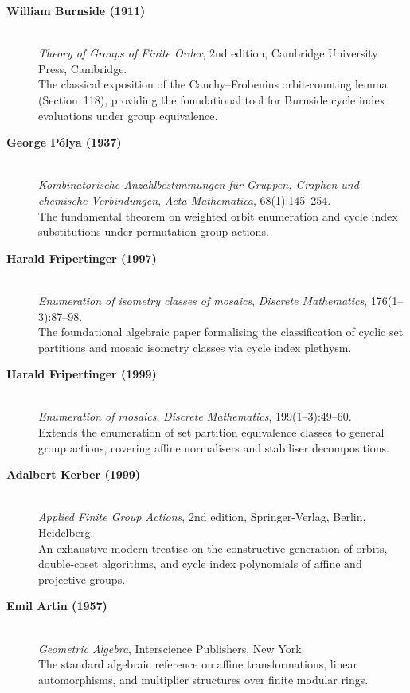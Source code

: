 \begin{description}
    \item[\textbf{William Burnside (1911)}]\mbox{}\\
    \emph{Theory of Groups of Finite Order}, 2nd edition, Cambridge University Press, Cambridge.\\
    The classical exposition of the Cauchy--Frobenius orbit-counting lemma (Section~118), providing the foundational tool for Burnside cycle index evaluations under group equivalence.

    \item[\textbf{George P\'olya (1937)}]\mbox{}\\
    \emph{Kombinatorische Anzahlbestimmungen f\"ur Gruppen, Graphen und chemische Verbindungen}, \emph{Acta Mathematica}, 68(1):145--254.\\
    The fundamental theorem on weighted orbit enumeration and cycle index substitutions under permutation group actions.

    \item[\textbf{Harald Fripertinger (1997)}]\mbox{}\\
    \emph{Enumeration of isometry classes of mosaics}, \emph{Discrete Mathematics}, 176(1--3):87--98.\\
    The foundational algebraic paper formalising the classification of cyclic set partitions and mosaic isometry classes via cycle index plethysm.

    \item[\textbf{Harald Fripertinger (1999)}]\mbox{}\\
    \emph{Enumeration of mosaics}, \emph{Discrete Mathematics}, 199(1--3):49--60.\\
    Extends the enumeration of set partition equivalence classes to general group actions, covering affine normalisers and stabiliser decompositions.

    \item[\textbf{Adalbert Kerber (1999)}]\mbox{}\\
    \emph{Applied Finite Group Actions}, 2nd edition, Springer-Verlag, Berlin, Heidelberg.\\
    An exhaustive modern treatise on the constructive generation of orbits, double-coset algorithms, and cycle index polynomials of affine and projective groups.

    \item[\textbf{Emil Artin (1957)}]\mbox{}\\
    \emph{Geometric Algebra}, Interscience Publishers, New York.\\
    The standard algebraic reference on affine transformations, linear automorphisms, and multiplier structures over finite modular rings.
\end{description}

